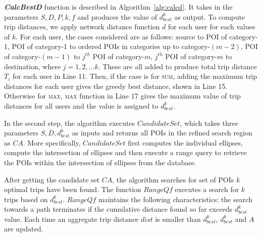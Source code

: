 \textbf{\textit{CalcBestD}} function is described in Algorithm~\ref{alg:calcd}. It takes in the parameters $S, D, P, k, f$ and produces the value of $d_{best}^k$ as output. To compute trip distances, we apply network distance function $d$ for each user for each values of $k$. For each user, the cases considered are as follows: source to POI of category-1, POI of category-1 to ordered POIs in categories up to category-$(m-2)$, POI of category-$(m-1)$ to $j^{th}$ POI of category-$m$, $j^{th}$ POI of category-$m$ to destination, where $j={1,2, \dots k}$. These are all added to produce total trip distance $T_i$ for each user in Line 11. Then, if the case is for \textsc{sum}, adding the maximum trip distances for each user gives the greedy best distance, shown in Line 15. Otherwise for \textsc{max}, \textsc{max} function in Line 17 gives the maximum value of trip distances for all users and the value is assigned to $d_{best}^k$.


In the second step, the algorithm executes $CandidateSet$, which takes three parameters $S,D,d_{best}^k$ as inputs and returns all POIs in the refined search region as $CA$. More specifically, $CandidateSet$ first computes the individual ellipses, compute the intersection of ellipses and then execute a range query to retrieve the POIs within the intersection of ellipses from the database.

After getting the candidate set $CA$, the algorithm searches for set of POIs $k$ optimal trips have been found. The function $RangeQf$ executes a search for $k$ trips based on $d_{best}^k$. $RangeQf$ maintains the following characteristics: the search towards a path terminates if the cumulative distance found so far exceeds $d_{best}^k$ value. Each time an aggregate trip distance $dist$ is smaller than $d_{best}^k$, $d_{best}^k$ and $A$ are updated.

